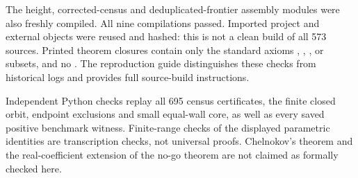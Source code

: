 The height, corrected-census and deduplicated-frontier assembly modules were also freshly compiled. All nine compilations passed. Imported project and external objects were reused and hashed: this is not a clean build of all 573 sources. Printed theorem closures contain only the standard axioms , , , or subsets, and no . The reproduction guide distinguishes these checks from historical logs and provides full source-build instructions.

Independent Python checks replay all 695 census certificates, the finite closed orbit, endpoint exclusions and small equal-wall core, as well as every saved positive benchmark witness. Finite-range checks of the displayed parametric identities are transcription checks, not universal proofs. Chelnokov's theorem and the real-coefficient extension of the no-go theorem are not claimed as formally checked here.

